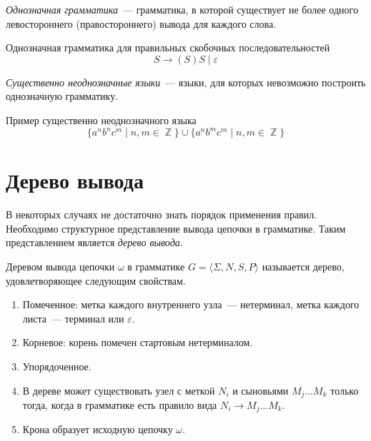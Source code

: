 \begin{definition}
    \emph{Однозначная грамматика}~--- грамматика, в которой существует не более одного левостороннего (правостороннего) вывода для каждого слова.
\end{definition}

\begin{example}
    Однозначная грамматика для правильных скобочных последовательностей
    \[
        S \to (S)S \mid \varepsilon
    \]
\end{example}

\begin{definition}
    \emph{Существенно неоднозначные языки}~--- языки, для которых невозможно построить однозначную грамматику.
\end{definition}

\begin{example}
    Пример существенно неоднозначного языка
    \[\{a^n b^n c^m \mid n, m \in \BbbZ\} \cup \{a^n b^m c^m \mid n,m \in \BbbZ\}\]
\end{example}

\section{Дерево вывода}
\label{sect:DerivTree}

В некоторых случаях не достаточно знать порядок применения правил.
Необходимо структурное представление вывода цепочки в грамматике.
Таким представлением является \emph{дерево вывода}.

\begin{definition}
    Деревом вывода цепочки $\omega$ в грамматике $G = \langle \Sigma, N, S, P \rangle$ называется дерево, удовлетворяющее следующим свойствам.
    \begin{enumerate}
        \item Помеченное: метка каждого внутреннего узла~--- нетерминал, метка каждого листа~--- терминал или $\varepsilon$.
        \item Корневое: корень помечен стартовым нетерминалом.
        \item Упорядоченное.
        \item В дереве может существовать узел с меткой $N_i$ и сыновьями $M_j \dots M_k$ только тогда, когда в грамматике есть правило вида $N_i \to M_j \dots M_k$.
        \item Крона образует исходную цепочку $\omega$.
    \end{enumerate}
\end{definition}

